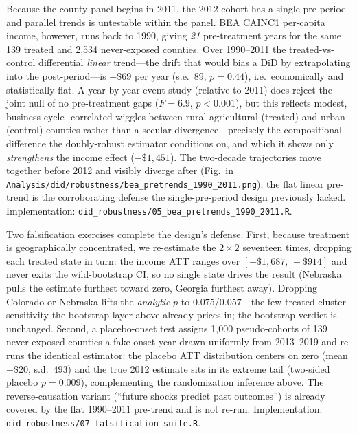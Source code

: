 \documentclass[11pt]{article}
\begin{document}
Because the county panel begins in 2011, the 2012 cohort has a single pre-period and
parallel trends is untestable within the panel. BEA CAINC1 per-capita income, however,
runs back to 1990, giving \emph{21} pre-treatment years for the same 139 treated and
2{,}534 never-exposed counties. Over 1990--2011 the treated-vs-control differential
\emph{linear} trend---the drift that would bias a DiD by extrapolating into the
post-period---is $-\$69$ per year (s.e.\ 89, $p=0.44$), i.e.\ economically and
statistically flat. A year-by-year event study (relative to 2011) does reject the joint
null of no pre-treatment gaps ($F=6.9$, $p<0.001$), but this reflects modest, business-cycle-
correlated wiggles between rural-agricultural (treated) and urban (control) counties rather
than a secular divergence---precisely the compositional difference the doubly-robust
estimator conditions on, and which it shows only \emph{strengthens} the income effect
($-\$1{,}451$). The two-decade trajectories move together before 2012 and visibly diverge
after (Fig.\ in \texttt{Analysis/did/robustness/bea\_pretrends\_1990\_2011.png}); the flat
linear pre-trend is the corroborating defense the single-pre-period design previously lacked.
Implementation: \texttt{did\_robustness/05\_bea\_pretrends\_1990\_2011.R}.

Two falsification exercises complete the design's defense. First, because treatment is
geographically concentrated, we re-estimate the $2\times2$ seventeen times, dropping each
treated state in turn: the income ATT ranges over $[-\$1{,}687,\,-\$914]$ and never exits
the wild-bootstrap CI, so no single state drives the result (Nebraska pulls the estimate
furthest toward zero, Georgia furthest away). Dropping Colorado or Nebraska lifts the
\emph{analytic} $p$ to $0.075$/$0.057$---the few-treated-cluster sensitivity the bootstrap
layer above already prices in; the bootstrap verdict is unchanged. Second, a placebo-onset
test assigns 1{,}000 pseudo-cohorts of 139 never-exposed counties a fake onset year drawn
uniformly from 2013--2019 and re-runs the identical estimator: the placebo ATT distribution
centers on zero (mean $-\$20$, s.d.\ $493$) and the true 2012 estimate sits in its extreme
tail (two-sided placebo $p=0.009$), complementing the randomization inference above. The
reverse-causation variant (``future shocks predict past outcomes'') is already covered by
the flat 1990--2011 pre-trend and is not re-run.
Implementation: \texttt{did\_robustness/07\_falsification\_suite.R}.

\end{document}

